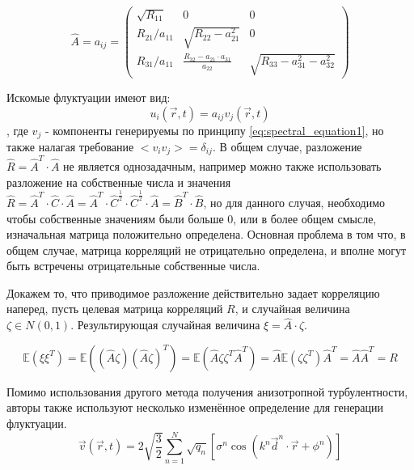\begin{equation}
    \label{eq:spectral_equation18_3}
     \hat{A} = a_{ij} = \begin{pmatrix}
                            \sqrt{R_{11}} & 0 & 0 \\
                            R_{21} / a_{11} & \sqrt{R_{22} - a_{21}^2} & 0 \\
                            R_{31} / a_{11} & \frac{R_{32} - a_{21} \cdot a_{31}}{a_22} & \sqrt{R_{33} - a_{31}^2 - a_{32}^2}
                        \end{pmatrix}
\end{equation}

Искомые флуктуации имеют вид:
\begin{equation}
    \label{eq:spectral_equation19}
    u_i(\vec r, t) = a_{ij} v_j(\vec r, t)
\end{equation}
\noindent
, где $v_j$ - компоненты генерируемы по принципу \eqref{eq:spectral_equation1}, но также налагая требование $<v_i v_j> = \delta_{ij}$. В общем случае, разложение $\hat{R} = \hat{A}^T \cdot \hat{A}$ не является однозадачным, например можно также использовать разложение на собственные числа и значения $\hat{R} = \hat{A}^T \cdot \hat{C} \cdot \hat{A} = \hat{A}^T \cdot \hat{C}^{\frac{1}{2}} \cdot \hat{C}^{\frac{1}{2}} \cdot \hat{A} = \hat{B}^T \cdot \hat{B}$, но для данного случая, необходимо чтобы собственные значениям были больше 0, или в более общем смысле, изначальная матрица положительно определена. Основная проблема в том что, в общем случае, матрица корреляций не отрицательно определена, и вполне могут быть встречены отрицательные собственные числа. 

Докажем то, что приводимое разложение действительно задает корреляцию наперед, пусть целевая матрица корреляций $R$, и случайная величина $\zeta \in N(0, 1)$. Результирующая случайная величина $\xi = \hat{A} \cdot \zeta$. 

\begin{equation}
    \label{eq:spectral_equation19_1}
    \mathbb{E} \left(\xi \xi^T\right) = \mathbb{E} \left((\hat{A} \zeta)(\hat{A} \zeta)^T \right) = \mathbb{E} \left(\hat{A} \zeta \zeta^T \hat{A}^T\right) = \hat{A} \mathbb{E} \left(\zeta \zeta^T \right) \hat{A}^T = \hat{A} \hat{A}^T = R
\end{equation}

Помимо использования другого метода получения анизотропной турбулентности, авторы также используют несколько изменённое определение для генерации флуктуации. 
\begin{equation}
    \label{eq:spectral_equation20}
    \vec{v}(\vec r, t) = 2 \sqrt{\dfrac{3}{2}} \sum_{n=1}^N \sqrt{q_n} \left[ \sigma^n \cos{(k^n \vec{d}^n \cdot 
    \vec r + \phi^n)} \right]
\end{equation}

